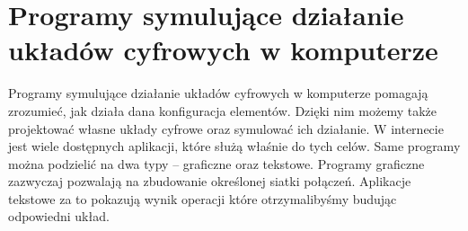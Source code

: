 \documentclass[12pt, a4paper, onside, polish]{article}				%
\begin{document}
\setlength\parindent{24pt}

\cleardoublepage

\section{Programy symulujące działanie układów cyfrowych w komputerze}
\hspace{\parindent}
Programy symulujące działanie układów cyfrowych w komputerze pomagają zrozumieć, jak działa dana konfiguracja elementów. Dzięki nim możemy także projektować własne układy cyfrowe oraz symulować ich działanie. W internecie jest wiele dostępnych aplikacji, które służą właśnie do tych celów. Same programy można podzielić na dwa typy – graficzne oraz tekstowe. Programy graficzne zazwyczaj pozwalają na zbudowanie określonej siatki połączeń. Aplikacje tekstowe za to pokazują wynik operacji które otrzymalibyśmy budując odpowiedni układ.  
\end{document}
